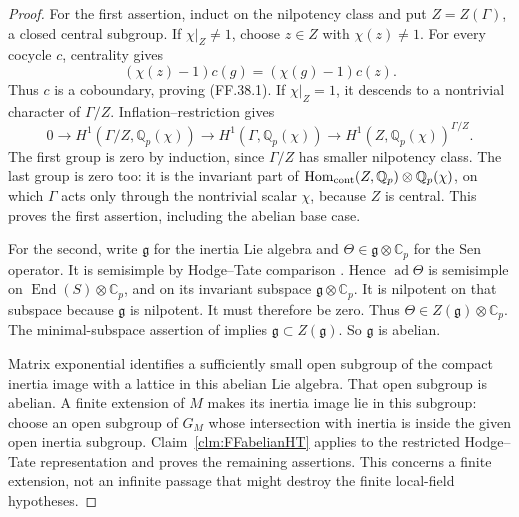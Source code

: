 \begin{proof}
For the first assertion, induct on the
nilpotency class and put \(Z=Z(\Gamma)\), a closed central subgroup. If
\(\chi|_Z\ne1\), choose \(z\in Z\)
with \(\chi(z)\ne1\). For every cocycle
\(c\), centrality gives
\[
             (\chi(z)-1)c(g)=(\chi(g)-1)c(z).
\]
Thus \(c\) is a coboundary, proving
(FF.38.1). If \(\chi|_Z=1\), it descends
to a nontrivial character of \(\Gamma/Z\).
Inflation--restriction gives
\[
 0\longrightarrow H^1(\Gamma/Z,\mathbb Q_p(\chi))
 \longrightarrow H^1(\Gamma,\mathbb Q_p(\chi))
 \longrightarrow H^1(Z,\mathbb Q_p(\chi))^{\Gamma/Z}.
\]
The first group is zero by induction,
since \(\Gamma/Z\) has smaller
nilpotency class. The last group is
zero too: it is the invariant part
of \(\operatorname{Hom}_{\rm cont}(Z,\mathbb Q_p)
\otimes\mathbb Q_p(\chi)\), on which
\(\Gamma\) acts only through the
nontrivial scalar \(\chi\), because
\(Z\) is central. This proves the
first assertion, including the abelian
base case.

For the second, write \(\mathfrak g\)
for the inertia Lie algebra and
\(\Theta\in\mathfrak g\otimes\mathbb C_p\)
for the Sen operator. It is semisimple
by Hodge--Tate comparison
\citep[Section~2.7]{FF_Fontaine2004}.
Hence \(\operatorname{ad}\Theta\)
is semisimple on
\(\operatorname{End}(S)\otimes\mathbb C_p\),
and on its invariant subspace
\(\mathfrak g\otimes\mathbb C_p\).
It is nilpotent on that subspace
because \(\mathfrak g\) is nilpotent.
It must therefore be zero. Thus
\(\Theta\in Z(\mathfrak g)\otimes\mathbb C_p\).
The minimal-subspace assertion of
\citet[Theorem~3.1, \(d=0\)]{FF_Ohkubo2014}
implies
\(\mathfrak g\subset Z(\mathfrak g)\).
So \(\mathfrak g\) is abelian.

Matrix exponential identifies a
sufficiently small open subgroup
of the compact inertia image with
a lattice in this abelian Lie algebra.
That open subgroup is abelian.
A finite extension of \(M\) makes
its inertia image lie in this subgroup:
choose an open subgroup of \(G_M\)
whose intersection with inertia is
inside the given open inertia subgroup.
Claim~\ref{clm:FFabelianHT} applies
to the restricted Hodge--Tate
representation and proves the
remaining assertions. This concerns
a finite extension, not an infinite
passage that might destroy the
finite local-field hypotheses.
\end{proof}

